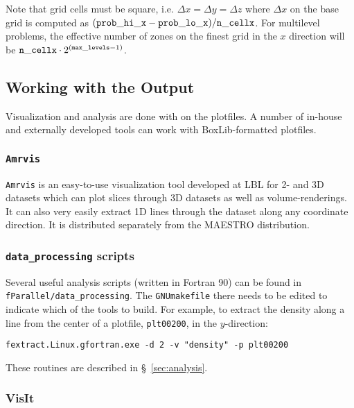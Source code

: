 Note that grid cells must be square, i.e. $\Delta x = \Delta y = \Delta z$
where $\Delta x$ on the base grid is computed as $({\tt prob\_hi\_x}
- {\tt prob\_lo\_x})/{\tt n\_cellx}$.  For multilevel problems, the effective
number of zones on the finest grid in the $x$ direction will be
${\tt n\_cellx} \cdot 2^{({\tt max\_levels} -1)}$.



\subsection{Working with the Output}

Visualization and analysis are done with on the plotfiles.  A
number of in-house and externally developed tools can work 
with BoxLib-formatted plotfiles.


\subsubsection{\tt Amrvis}

{\tt Amrvis} is an easy-to-use visualization tool developed at LBL for
2- and 3D datasets which can plot slices through 3D datasets as well
as volume-renderings.  It can also very easily extract 1D lines
through the dataset along any coordinate direction.  It is distributed
separately from the MAESTRO distribution.


\subsubsection{{\tt data\_processing} scripts}

Several useful analysis scripts (written in Fortran 90) can be found
in {\tt fParallel/data\_processing}.  The {\tt GNUmakefile} there
needs to be edited to indicate which of the tools to build.  For
example, to extract the density along a line from the center of a
plotfile, {\tt plt00200}, in the $y$-direction:

\begin{verbatim}
fextract.Linux.gfortran.exe -d 2 -v "density" -p plt00200
\end{verbatim}

These routines are described in \S~\ref{sec:analysis}.




\subsubsection{VisIt}


